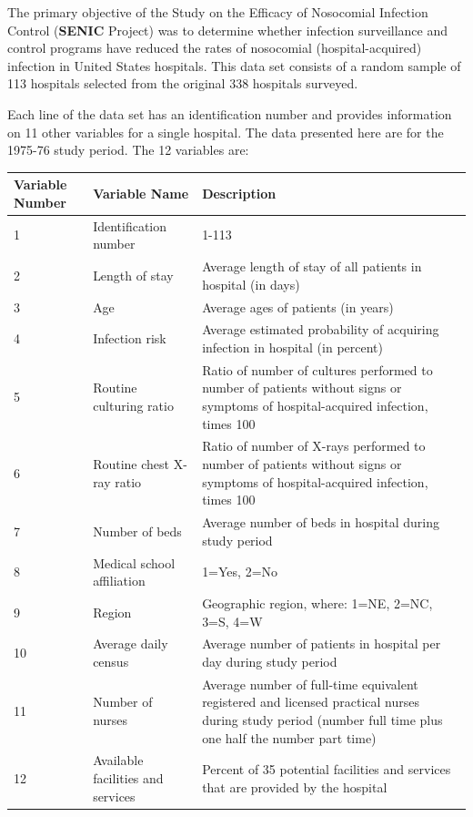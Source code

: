 \documentclass[11pt]{article}
\begin{document}
\begin{info}\label{info}
The primary objective of the Study on the Efficacy of Nosocomial Infection Control (\textbf{SENIC} Project) was to determine whether infection surveillance and control programs have reduced the rates of nosocomial (hospital-acquired) infection in United States hospitals. This data set consists of a random sample of 113 hospitals selected from the original 338 hospitals surveyed. 

Each line of the data set has an identification number and provides information on 11 other variables for a single hospital. The data presented here are for the 1975-76 study period. The 12 variables are:
\end{info}
\begin{table}[h]
\begin{center}
\label{tab:table1}
\begin{tabularx}{\textwidth}{p{2.7cm}p{3.8cm}p{8.4cm}}
\hline
\textbf{Variable Number} & \textbf{Variable Name} & \textbf{Description} \\ 
\hline
1  & Identification number             & 1-113 \\
2  & Length of stay                    & Average length of stay of all patients in hospital (in days) \\
3  & Age                               & Average ages of patients (in years)\\
4  & Infection risk                    & Average estimated probability of acquiring infection in hospital (in percent) \\
5  & Routine culturing ratio           & Ratio of number of cultures performed to number of patients without signs or symptoms of hospital-acquired infection, times 100 \\
6  & Routine chest X-ray ratio         & Ratio of number of X-rays performed to number of patients without signs or symptoms of hospital-acquired infection, times 100 \\
7  & Number of beds                    & Average number of beds in hospital during study period \\
8  & Medical school affiliation        & 1=Yes, 2=No \\
9  & Region                            & Geographic region, where: 1=NE, 2=NC, 3=S, 4=W \\
10 & Average daily census              & Average number of patients in hospital per day during study period \\
11 & Number of nurses                  & Average number of full-time equivalent registered and licensed practical nurses during study period (number full time plus one half the number part time) \\
12 & Available facilities and services & Percent of 35 potential facilities and services that are provided by the hospital \\
\hline
\end{tabularx}
\end{center}
\end{table}
\end{document}
